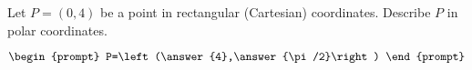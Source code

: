 \documentclass{ximera}
\author{Gregory Hartman \and Matthew Carr}
\begin{document}
\begin{exercise}





Let $P=(0,4)$ be a point in rectangular (Cartesian) coordinates. Describe $P$ in polar coordinates.

\[
\begin{prompt}
P=\left(\answer{4},\answer{\pi/2}\right)
\end{prompt}
\]

\end{exercise}
\end{document}
